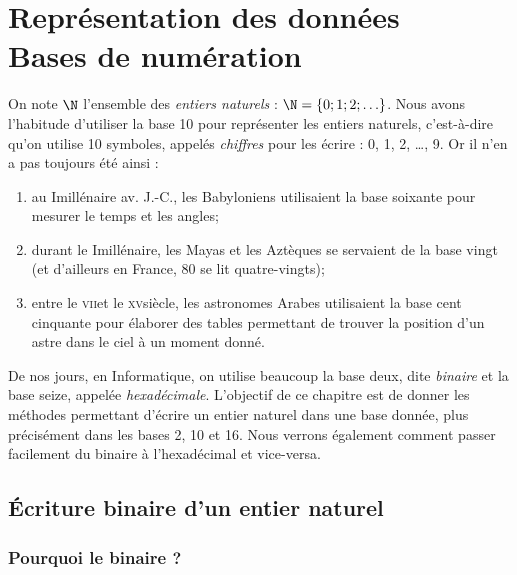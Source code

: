\documentclass[a4paper,12pt,french]{book}
\begin{document}
\setcounter{chapter}{1}

\chapter{\large Représentation des données\\[-1em]\fontsize{35pt}{42pt}\selectfont\titlefont Bases de numération}


On note $\N$ l'ensemble des \textit{entiers naturels} : $\N=\lbrace 0;1;2;\ldots\}$.
Nous avons l'habitude d'utiliser la base 10 pour représenter les entiers naturels, c'est-à-dire qu'on utilise 10 symboles, appelés \textit{chiffres}
pour les écrire : 0, 1, 2, \ldots, 9.
Or il n'en a pas toujours été ainsi :
\begin{enumerate}[--]
	\item 	au \textsc{I}\er millénaire av. J.-C., les Babyloniens utilisaient la base soixante pour mesurer le temps et les angles;
	\item 	durant le \textsc{I}\er millénaire, les Mayas et les Aztèques se servaient de la base vingt (et d'ailleurs en France, 80 se lit \og
	quatre-vingts\fg);
	\item 	entre le \textsc{vii}\eme et le \textsc{xv}\eme siècle, les astronomes Arabes utilisaient la base cent cinquante pour élaborer des tables
	permettant de trouver la position d'un astre dans le ciel à un moment donné.
\end{enumerate}
De nos jours, en Informatique, on utilise beaucoup la base deux, dite \textit{binaire} et la base seize, appelée \textit{hexadécimale}.
L'objectif de ce chapitre est de donner les méthodes permettant d'écrire un entier naturel dans une base donnée, plus précisément dans les bases 2,
10 et 16. Nous verrons également comment passer facilement du binaire à l'hexadécimal et vice-versa.

\section{\'Ecriture binaire d'un entier naturel}
\subsection{Pourquoi le binaire ?}
\end{document}
